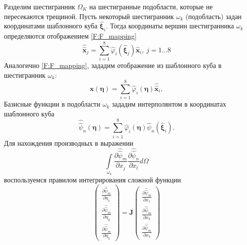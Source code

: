 Разделим шестигранник $\Omega_K$ на шестигранные подобласти, которые не пересекаются трещиной. Пусть некоторый шестигранник $\omega_k$ (подобласть) задан координатами шаблонного куба $\hat{\bm{\xi}}_i$. Тогда координаты вершин шестигранника $\omega_k$ определяются отображением \eqref{F:F_mapping}
\begin{equation}
\hat{\hat{\mathbf{x}}}_j=\sum_{i=1}^{8}\hat{\varphi}_i\left(\hat{\bm{\xi}}_j\right)\hat{\mathbf{x}}_i,\: j=1\ldots 8
\label{F:F_sub_vertexes}
\end{equation}
Аналогично \eqref{F:F_mapping}, зададим отображение из шаблонного куба в шестигранник $\omega_k$:
\begin{equation}
\mathbf{x}\left(\bm{\eta}\right)=\sum_{i=1}^{8}\hat{\varphi}_i\left(\bm{\eta}\right)\hat{\hat{\mathbf{x}}}_i,
\label{F:F_sub_mapping}
\end{equation}
Базисные функции в подобласти $\omega_k$ зададим интерполянтом в координатах шаблонного куба
\begin{equation}
\hat{\hat{\psi}}_n\left(\bm{\eta}\right)=\sum_{i=1}^{8}\hat{\varphi}_i\left(\bm{\eta}\right)
\hat{\psi}_n\left(\hat{\bm{\xi}}_i\right).
\label{F:F_sub_busfuncvalues}
\end{equation}
Для нахождения производных в выражении
\begin{equation}
\int\limits_{\omega_k}\frac{\partial\hat{\hat{\psi}}_{m}}{\partial x_j}\frac{\partial\hat{\hat{\psi}}_{n}}{\partial x_{l}}d\Omega
\label{F:F_sub_int1}
\end{equation}
воспользуемся правилом интегрирования сложной функции
\begin{equation}
\left(
\begin{array}{c}
\frac{\partial\hat{\hat{\psi}}_{m}}{\partial\eta_1} \\
\frac{\partial\hat{\hat{\psi}}_{m}}{\partial\eta_2} \\
\frac{\partial\hat{\hat{\psi}}_{m}}{\partial\eta_3} 
\end{array}
\right)
=
\mathbf{J}
\left(
\begin{array}{c}
\frac{\partial\hat{\hat{\psi}}_{m}}{\partial x_1} \\
\frac{\partial\hat{\hat{\psi}}_{m}}{\partial x_2} \\
\frac{\partial\hat{\hat{\psi}}_{m}}{\partial x_3} 
\end{array}
\right)
\label{F:F_sub_dif1}
\end{equation}

